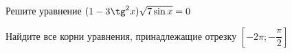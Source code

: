 \begin{ex}
	\begin{condition}
		\begin{enumcols}[label=\asbuk*)]
			\item Решите уравнение \( (1-3\tg^2 x )\sqrt{7\sin x} = 0 \)
			\item Найдите все корни уравнения, принадлежащие отрезку \( \left[-2\pi;-\dfrac{\pi}{2}\right] \)
		\end{enumcols}
	\end{condition}
\end{ex}